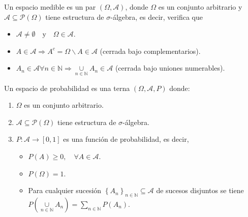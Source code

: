 \begin{definicion}
	Un espacio medible es un par $(\Omega, \mathcal{A})$, donde $\Omega$ es un conjunto arbitrario y $\mathcal{A} \subseteq \mathcal{P}(\Omega)$ tiene estructura de $\sigma$-álgebra, es decir, verifica que 
		
		\begin{itemize}
			\item $\mathcal{A} \neq \emptyset \quad \text{y} \quad \Omega \in \mathcal{A}$.

			\item $A \in \mathcal{A} \Rightarrow A^c = \Omega \backslash A \in \mathcal{A}$ (cerrada bajo complementarios).

			\item $A_n \in \mathcal{A} \forall n \in \mathbb{N} \Rightarrow \underset{n \in \mathbb{N}}{\cup} A_n \in \mathcal{A}$ (cerrada bajo uniones numerables).
		\end{itemize}
\end{definicion}


\begin{definicion}\label{def:esprob}
	Un espacio de probabilidad es una terna $(\Omega, \mathcal{A},P)$ donde:
	
	\begin{enumerate}
	
		\item $\Omega$ es un conjunto arbitrario.

		\item{$\mathcal{A} \subseteq \mathcal{P}(\Omega)$ tiene estructura de $\sigma$-álgebra.

		}

		\item{$P:\mathcal{A} \rightarrow [0,1]$ es una función de probabilidad, es decir,

		\begin{itemize}
			\item $P(A)\geq 0, \quad \forall A \in \mathcal{A}$.

			\item $P(\Omega)=1$.

			\item Para cualquier sucesión $\left \{ A_n \right \}_{n \in \mathbb{N}} \subseteq \mathcal{A}$ de sucesos disjuntos se tiene $P \left ( \underset{n \in \mathbb{N}}{\cup} A_n \right ) = \sum_{n \in \mathbb{N}} P(A_n)$.
		\end{itemize}

		}
	\end{enumerate}
\end{definicion}

